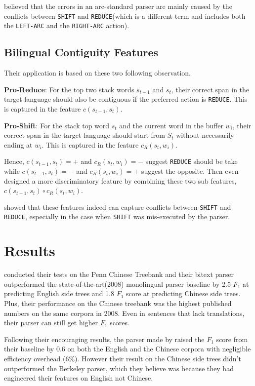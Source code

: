 \documentclass[11pt]{article} %
\begin{document}
\cite{Huang:2009:BSP:1699648.1699668} believed that the errors in an arc-standard parser are mainly caused by the conflicts between \verb|SHIFT| and \verb|REDUCE|(which is a different term and includes both the \verb|LEFT-ARC| and the \verb|RIGHT-ARC| action).

\subsection{Bilingual Contiguity Features}

Their application is based on these two following observation.

\textbf{Pro-Reduce}: For the top two stack words $s_{t-1}$ and $s_t$, their correct span in the target language should also be contiguous if the preferred action is \verb|REDUCE|. This is captured in the feature $c(s_{t-1}, s_t)$.

\textbf{Pro-Shift}: For the stack top word $s_t$ and the current word in the buffer $w_i$, their correct span in the target language should start from $S_t$ without necessarily ending at $w_i$. This is captured in the feature $c_R(s_t, w_i)$.

Hence, $c(s_{t-1}, s_t)=+$ and $c_R(s_t, w_i)=-$ suggest \verb|REDUCE| should be take while $c(s_{t-1}, s_t)=-$ and $c_R(s_t, w_i)=+$ suggest the opposite. Then even designed a more discriminatory feature by combining these two sub features, $c(s_{t-1}, s_t)\circ c_R(s_t, w_i)$.

\cite{Huang:2009:BSP:1699648.1699668} showed that these features indeed can capture conflicts between \verb|SHIFT| and \verb|REDUCE|, especially in the case when \verb|SHIFT| was mis-executed by the parser.

\section{Results}

\cite{Burkett:2008:TLB:1613715.1613828} conducted their tests on the Penn Chinese Treebank and their bitext parser outperformed the state-of-the-art(2008) monolingual parser baseline by 2.5 $F_1$ at predicting English side trees and 1.8 $F_1$ score at predicting Chinese side trees. Plus, their performance on the Chinese treebank was the highest published numbers on the same corpora in 2008. Even in sentences that lack translations, their parser can still get higher $F_1$ scores.

Following their encouraging results, the parser made by \cite{Huang:2009:BSP:1699648.1699668} raised the $F_1$ score from their baseline by 0.6 on both the English and the Chinese corpora with negligible efficiency overhead (6\%). However their result on the Chinese side trees didn't outperformed the Berkeley parser, which they believe was because they had engineered their features on English not Chinese.
\end{document}
